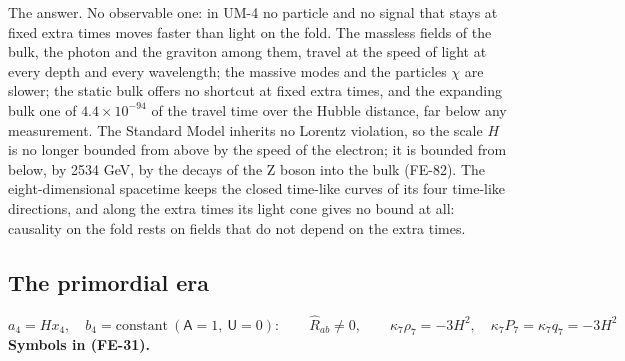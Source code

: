 \documentclass[
  10pt,
]{article}
\begin{document}
The answer. No observable one: in UM-4 no particle and no signal that
stays at fixed extra times moves faster than light on the fold. The
massless fields of the bulk, the photon and the graviton among them,
travel at the speed of light at every depth and every wavelength; the
massive modes and the particles \(\chi\) are slower; the static bulk
offers no shortcut at fixed extra times, and the expanding bulk one of
\(4.4\times10^{-94}\) of the travel time over the Hubble distance, far
below any measurement. The Standard Model inherits no Lorentz violation,
so the scale \(H\) is no longer bounded from above by the speed of the
electron; it is bounded from below, by 2534 GeV, by the decays of the Z
boson into the bulk (FE-82). The eight-dimensional spacetime keeps the
closed time-like curves of its four time-like directions, and along the
extra times its light cone gives no bound at all: causality on the fold
rests on fields that do not depend on the extra times.

\hypertarget{the-primordial-era}{%
\subsection{The primordial era}\label{the-primordial-era}}

\[
a_4 = Hx_4,\quad b_4 = \text{constant}\ (\mathsf{A} = 1,\ \mathsf{U} = 0):\qquad
\hat R_{ab} \ne 0,\qquad \kappa_7\rho_7 = -3H^2,\quad \kappa_7P_7 = \kappa_7q_7 = -3H^2 \tag{FE-31}
\] \textbf{Symbols in (FE-31).}
\end{document}
